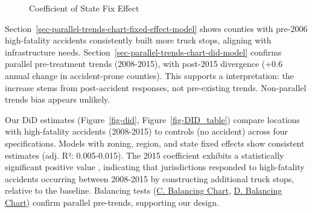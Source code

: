 \documentclass[
  12pt]{article}
\begin{document}
\begin{figure}


\caption{\label{fig-StateZoning}Coefficient of State Fix Effect}

\end{figure}%

Section~\ref{sec-parallel-trends-chart-fixed-effect-model} shows
counties with pre-2006 high-fatality accidents consistently built more
truck stops, aligning with infrastructure needs.
Section~\ref{sec-parallel-trends-chart-did-model} confirms parallel
pre-treatment trends (2008-2015), with post-2015 divergence (+0.6 annual
change in accident-prone counties). This supports a interpretation: the
increase stems from post-accident responses, not pre-existing trends.
Non-parallel trends bias appears unlikely.

Our DiD estimates (Figure~\ref{fig-did}, Figure~\ref{fig-DID_table})
compare locations with high-fatality accidents (2008-2015) to controls
(no accident) across four specifications. Models with zoning, region,
and state fixed effects show consistent estimates (adj. R²:
0.005-0.015). The 2015 coefficient exhibits a statistically significant
positive value , indicating that jurisdictions responded to
high-fatality accidents occurring between 2008-2015 by constructing
additional truck stops, relative to the baseline. Balancing tests
(\hyperref[sec-c.-balancing_chart_region]{C. Balancing Chart},
\hyperref[sec-D.balancing_chart_state]{D. Balancing Chart}) confirm
parallel pre-trends, supporting our design.
\end{document}

